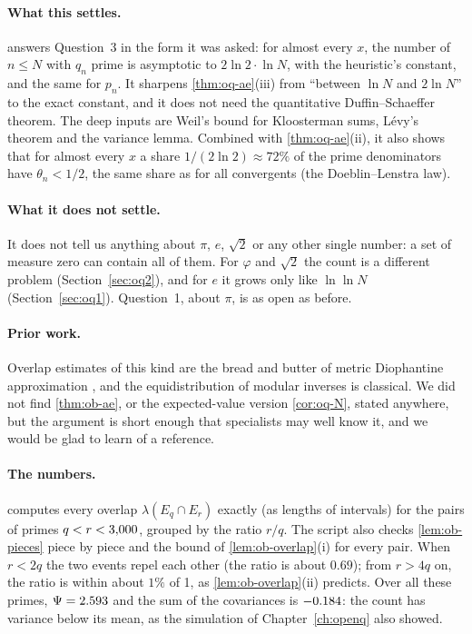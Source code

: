 \paragraph{What this settles.}  answers Question~3 in the form it was asked: for almost every $x$, the number of $n \le N$ with $q_n$ prime is asymptotic to $2\ln 2\cdot\ln N$, with the heuristic's constant, and the same for $p_n$. It sharpens \cref{thm:oq-ae}(iii) from ``between $\ln N$ and $2\ln N$'' to the exact constant, and it does not need the quantitative Duffin--Schaeffer theorem. The deep inputs are Weil's bound for Kloosterman sums, Lévy's theorem and the variance lemma. Combined with \cref{thm:oq-ae}(ii), it also shows that for almost every $x$ a share $1/(2\ln 2) \approx 72\%$ of the prime denominators have $\theta_n < 1/2$, the same share as for all convergents (the Doeblin--Lenstra law).

\paragraph{What it does not settle.} It does not tell us anything about $\pi$, $e$, $\sqrt 2$ or any other single number: a set of measure zero can contain all of them. For $\varphi$ and $\sqrt 2$ the count is a different problem (Section~\ref{sec:oq2}), and for $e$ it grows only like $\ln\ln N$ (Section~\ref{sec:oq1}). Question~1, about $\pi$, is as open as before.

\paragraph{Prior work.} Overlap estimates of this kind are the bread and butter of metric Diophantine approximation \citep{Harman1998}, and the equidistribution of modular inverses is classical. We did not find \cref{thm:ob-ae}, or the expected-value version \cref{cor:oq-N}, stated anywhere, but the argument is short enough that specialists may well know it, and we would be glad to learn of a reference.

\paragraph{The numbers.}  computes every overlap $\lambda(E_q \cap E_r)$ exactly (as lengths of intervals) for the \ObOvlPairs{} pairs of primes $q < r < 3{,}000$, grouped by the ratio $r/q$. The script also checks \cref{lem:ob-pieces} piece by piece and the bound of \cref{lem:ob-overlap}(i) for every pair. When $r < 2q$ the two events repel each other (the ratio is about $0.69$); from $r > 4q$ on, the ratio is within about $1\%$ of 1, as \cref{lem:ob-overlap}(ii) predicts. Over all these primes, $\Psi = 2.593$ and the sum of the covariances is $-0.184$: the count has variance below its mean, as the simulation of Chapter~\ref{ch:openq} also showed.


